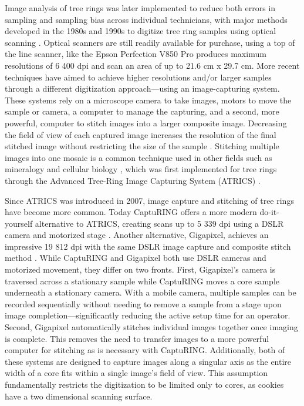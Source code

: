 \documentclass[a4paper,12pt]{article}
\begin{document}
Image analysis of tree rings was later implemented to reduce both errors in sampling and sampling bias across individual technicians, with major methods developed in the 1980s and 1990s to digitize tree ring samples using optical scanning \citep{mcmillin_application_1982} \citep{guay_new_1992}. Optical scanners are still readily available for purchase, using a top of the line scanner, like the Epson Perfection V850 Pro produces maximum resolutions of 6 400 dpi and scan an area of up to 21.6 cm x 29.7 cm.
More recent techniques have aimed to achieve higher resolutions and/or larger samples through a different digitization approach---using an image-capturing system. These systems rely on a microscope camera to take images, motors to move the sample or camera, a computer to manage the capturing, and a second, more powerful, computer to stitch images into a larger composite image.
Decreasing the field of view of each captured image increases the resolution of the final stitched image without restricting the size of the sample \citep{muhlich_stitching_2022}.
Stitching multiple images into one mosaic is a common technique used in other fields such as mineralogy and cellular biology \citep{ro_image_2021,mohammadi_fast_2024}, which was
first implemented for tree rings through the Advanced Tree-Ring Image Capturing System (ATRICS) \citep{levanic_atrics_2007}. %

Since ATRICS was introduced in 2007, image capture and stitching of tree rings have become more common. Today CaptuRING offers a more modern do-it-yourself alternative to ATRICS, creating scans up to 5 339 dpi using a DSLR camera and motorized stage \citep{garcia-hidalgo_capturing_2022}. 
Another alternative, Gigapixel, achieves an impressive 19 812 dpi with the same DSLR image capture and composite stitch method \citep{griffin_gigapixel_2021}. 
While CaptuRING and Gigapixel both use DSLR cameras and motorized movement, they differ on two fronts. 
First, Gigapixel's camera is traversed across a stationary sample while CaptuRING moves a core sample underneath a stationary camera.
With a mobile camera, multiple samples can be recorded sequentially without needing to remove a sample from a stage upon image completion---significantly reducing the active setup time for an operator. 
Second, Gigapixel automatically stitches individual images together once imaging is complete. This removes the need to transfer images to a more powerful computer for stitching as is necessary with CaptuRING.
Additionally, both of these systems are designed to capture images along a singular axis as the entire width of a core fits within a single image's field of view.
This assumption fundamentally restricts the digitization to be limited only to cores, as cookies have a two dimensional scanning surface. %
\end{document}
